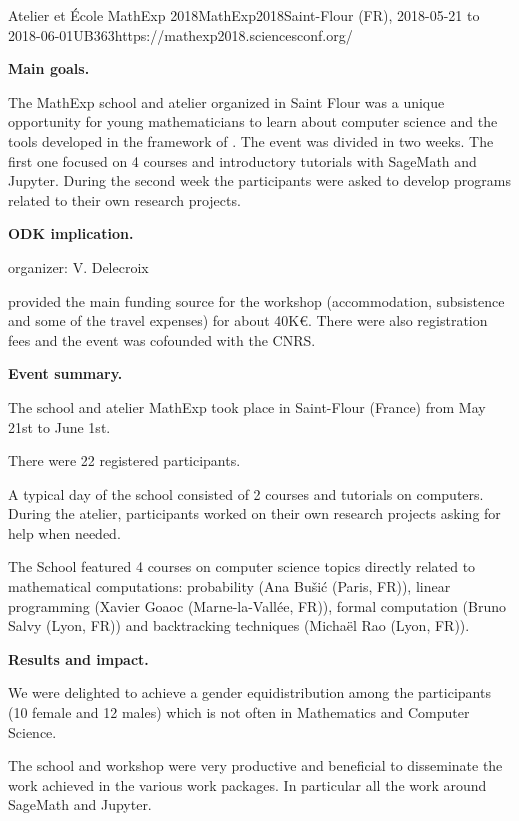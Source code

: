 \begin{event}{Atelier et \'Ecole MathExp 2018}{MathExp2018}{Saint-Flour (FR),
2018-05-21 to 2018-06-01}{UB}{36}{3}{https://mathexp2018.sciencesconf.org/}

\textbf{Main goals.}

The MathExp school and atelier organized in Saint Flour was a unique
opportunity for young mathematicians to learn about computer science
and the tools developed in the framework of \ODK. The event
was divided in two weeks. The first one focused on 4 courses and
introductory tutorials with SageMath and Jupyter. During the second
week the participants were asked to develop programs related to their
own research projects.

\textbf{ODK implication.} 

\ODK organizer: V. Delecroix

\ODK provided the main funding source for the workshop (accommodation,
subsistence and some of the travel expenses) for about 40K\euro. There were
also registration fees and the event was cofounded with the CNRS.

\textbf{Event summary.} 

The school and atelier MathExp took place in Saint-Flour (France)
from May 21st to June 1st.

There were 22 registered participants.

A typical day of the school consisted of 2 courses and tutorials
on computers. During the atelier, participants worked on their
own research projects asking for help when needed.

The School featured 4 courses on computer science topics directly
related to mathematical computations: probability (Ana Bušić (Paris, FR)),
linear programming (Xavier Goaoc (Marne-la-Vallée, FR)), formal computation
(Bruno Salvy (Lyon, FR)) and backtracking techniques (Michaël Rao (Lyon, FR)).

\textbf{Results and impact.} 

We were delighted to achieve a gender equidistribution among the participants
(10 female and 12 males) which is not often in Mathematics and Computer
Science.

The school and workshop were very productive and beneficial to disseminate
the work achieved in the various work packages. In particular
all the work around SageMath and Jupyter.

\end{event}
